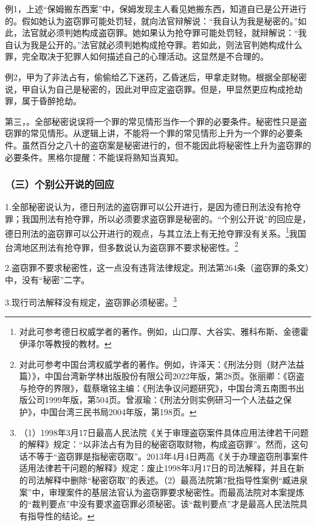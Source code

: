 例1，上述“保姆搬东西案”中，保姆发现主人看见她搬东西，知道自已是公开进行的。假如她认为盗窃罪可能处罚轻，就向法官辩解说：“我自认为我是秘密的。”如此，法官就必须判她构成盗窃罪。她如果认为抢夺罪可能处罚轻，就辩解说：“我自认为我是公开的。”法官就必须判她构成抢夺罪。若如此，则法官判她构成什么罪，完全取决于犯罪人如何描述自己的心理活动。这显然是不合理的。

例2，甲为了非法占有，偷偷给乙下迷药，乙昏迷后，甲拿走财物。根据全部秘密说，甲自认为自己是秘密的，因此对甲应定盗窃罪。但是，甲显然更应构成抢劫罪，属于昏醉抢劫。

第三，。全部秘密说误将一个罪的常见情形当作一个罪的必要条件。秘密性只是盗窃罪的常见情形。从逻辑上讲，不能将一个罪的常见情形上升为一个罪的必要条件。虽然百分之八十的盗窃案是秘密进行的，但不能因此将秘密性上升为盗窃罪的必要条件。黑格尔提醒：不能误将熟知当真知。

\subsubsection*{（三）个别公开说的回应}

1.全部秘密说认为，德日刑法的盗窃罪可以公开进行，是因为德日刑法没有抢夺罪；我国刑法有抢夺罪，所以必须要求盗窃罪是秘密的。“个别公开说”的回应是，德日刑法的盗窃罪可以公开进行的观点，与其立法上有无抢夺罪没有关系。\footnote{对此可参考德日权威学者的著作。例如，山口厚、大谷实、雅科布斯、金德霍伊泽尔等教授的教材。}我国台湾地区刑法有抢夺罪，但多数说认为盗窃罪不要求秘密性。\footnote{对此可参考中国台湾权威学者的著作。例如，许泽天：《刑法分则（财产法益篇）》，中国台湾新学林出版股份有限公司2022年版，第28页。张丽卿：《窃盗与抢夺的界限》，载蔡墩铭主编：《刑法争议问题研究》，中国台湾五南图书出版公司1999年版，第504页。曾淑瑜：《刑法分则实例研习一个人法益之保护》，中国台湾三民书局2004年版，第198页。}

2.盗窃罪不要求秘密性，这一点没有违背法律规定。刑法第264条（盗窃罪的条文）中，没有“秘密”二字。

3.现行司法解释没有规定，盗窃罪必须秘密。\footnote{（1）1998年3月17日最高人民法院《关于审理盗窃案件具体应用法律若干问题的解释》规定：“以非法占有为目的秘密窃取财物，构成盗窃罪”。然而，这句话不等于“盗窃罪是指秘密窃取”。2013年4月4日两高《关于办理盗窃刑事案件适用法律若干问题的解释》规定：废止1998年3月17日的司法解释，并且在新的司法解释中删除“秘密窃取”的表述。（2）最高法院第7批指导性案例“臧进泉案”中，审理案件的基层法官认为盗窃罪要求秘密性。而最高法院对本案提炼的“裁判要点”中没有要求盗窃罪必须秘密。该“裁判要点”才是最高人民法院具有指导性的结论。}

